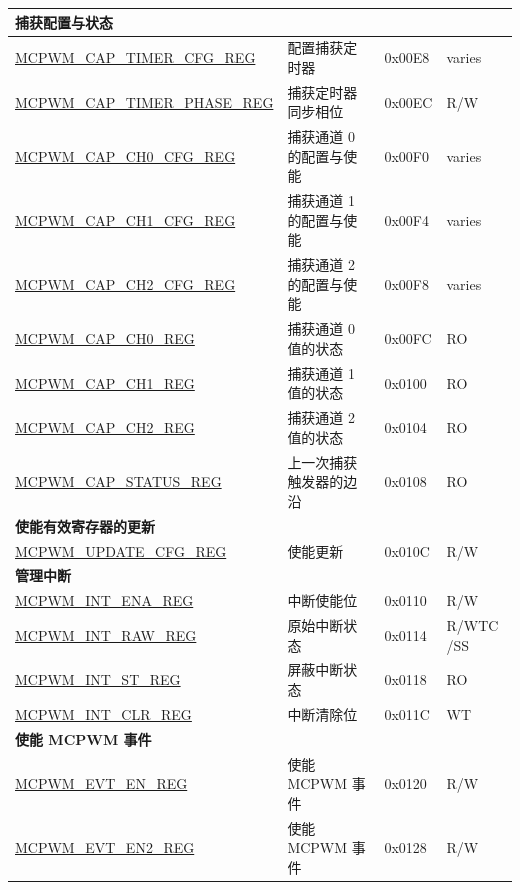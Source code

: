 \begin{longtable}{ | p{6cm} | p{7.2cm} | p{1.2cm} | p{1cm} | }
\multicolumn{4}{|l|}{\textbf{捕获配置与状态}} \\ \hline
\hyperref[regdesc:MCPWMCAPTIMERCFGREG]{MCPWM\_CAP\_TIMER\_CFG\_REG} & 配置捕获定时器 & 0x00E8 & varies \\ \hline
\hyperref[regdesc:MCPWMCAPTIMERPHASEREG]{MCPWM\_CAP\_TIMER\_PHASE\_REG} & 捕获定时器同步相位 & 0x00EC &  R/W \\ \hline
\hyperref[regdesc:MCPWMCAPCHNCFGREG]{MCPWM\_CAP\_CH0\_CFG\_REG} & 捕获通道 0 的配置与使能 & 0x00F0 & varies \\ \hline
\hyperref[regdesc:MCPWMCAPCHNCFGREG]{MCPWM\_CAP\_CH1\_CFG\_REG} & 捕获通道 1 的配置与使能 & 0x00F4 & varies \\ \hline
\hyperref[regdesc:MCPWMCAPCHNCFGREG]{MCPWM\_CAP\_CH2\_CFG\_REG} & 捕获通道 2 的配置与使能 &  0x00F8 & varies\\ \hline
\hyperref[regdesc:MCPWMCAPCHNREG]{MCPWM\_CAP\_CH0\_REG} & 捕获通道 0 值的状态 &0x00FC &  RO \\ \hline
\hyperref[regdesc:MCPWMCAPCHNREG]{MCPWM\_CAP\_CH1\_REG} & 捕获通道 1 值的状态 & 0x0100 & RO \\ \hline
\hyperref[regdesc:MCPWMCAPCHNREG]{MCPWM\_CAP\_CH2\_REG} & 捕获通道 2 值的状态 & 0x0104 & RO \\ \hline
\hyperref[regdesc:MCPWMCAPSTATUSREG]{MCPWM\_CAP\_STATUS\_REG} & 上一次捕获触发器的边沿 & 0x0108 & RO \\ \hline

\multicolumn{4}{|l|}{\textbf{使能有效寄存器的更新}} \\ \hline
\hyperref[regdesc:MCPWMUPDATECFGREG]{MCPWM\_UPDATE\_CFG\_REG} & 使能更新 & 0x010C &  R/W \\ \hline

\multicolumn{4}{|l|}{\textbf{管理中断}} \\ \hline
\hyperref[regdesc:MCPWMINTENAREG]{MCPWM\_INT\_ENA\_REG} & 中断使能位 & 0x0110 & R/W \\ \hline
\hyperref[regdesc:MCPWMINTRAWREG]{MCPWM\_INT\_RAW\_REG} & 原始中断状态 & 0x0114 & R/WTC
/SS\\ \hline
\hyperref[regdesc:MCPWMINTSTREG]{MCPWM\_INT\_ST\_REG} & 屏蔽中断状态 & 0x0118 & RO \\ \hline
\hyperref[regdesc:MCPWMINTCLRREG]{MCPWM\_INT\_CLR\_REG} & 中断清除位 & 0x011C & WT \\ \hline

\multicolumn{4}{|l|}{\textbf{使能 MCPWM 事件}} \\ \hline
\hyperref[regdesc:MCPWMEVTENREG]{MCPWM\_EVT\_EN\_REG} & 使能 MCPWM 事件 & 0x0120 & R/W \\ \hline
\hyperref[regdesc:MCPWMEVTEN2REG]{MCPWM\_EVT\_EN2\_REG} & 使能 MCPWM 事件 & 0x0128 & R/W \\ \hline


\end{longtable}

